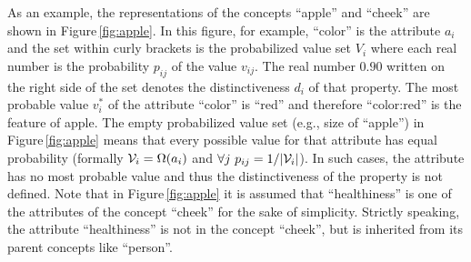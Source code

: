 As an example, the representations of the concepts ``apple'' and ``cheek''
are shown in Figure\,\ref{fig:apple}.  In this figure, for example, 
``color'' is the attribute $a_i$ and 
the set within curly brackets is the probabilized value set $V_i$ 
where each real number is the probability $p_{ij}$ of the value $v_{ij}$. 
The real number $0.90$ written on the right side of the set
denotes the distinctiveness $d_i$ of that property.
The most probable value $v^{*}_i$ of the attribute ``color'' is ``red'' and therefore
``color:red'' is the feature of apple.
The empty probabilized value set (e.g., size of ``apple'') in Figure\,\ref{fig:apple}
means that every possible value for that attribute has equal probability
(formally ${\cal V}_i = \Omega(a_i)$ and $\forall j~ p_{ij}=1/|{\cal V}_i|$).
In such cases, the attribute has no most probable value and thus 
the distinctiveness of the property is not defined.
Note that in Figure\,\ref{fig:apple} it is assumed that 
``healthiness'' is one of the attributes of the concept ``cheek'' 
for the sake of simplicity. 
Strictly speaking, the attribute ``healthiness'' 
is not in the concept ``cheek'', but is inherited from its parent concepts
like ``person''.

